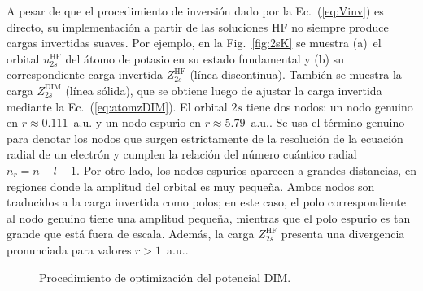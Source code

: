 A pesar de que el procedimiento de inversión dado por la 
Ec.~(\ref{eq:Vinv}) es directo, su implementación a partir de las 
soluciones HF no siempre produce cargas invertidas suaves. Por ejemplo,
en la Fig.~\ref{fig:2sK} se muestra (a)~el orbital $u_{2s}^{\mathrm{HF}}$ 
del átomo de potasio en su estado fundamental y (b) su correspondiente 
carga invertida $Z_{2s}^{\mathrm{HF}}$ (línea discontinua). También se 
muestra la carga $Z_{2s}^{\mathrm{DIM}}$ (línea sólida), que se obtiene 
luego de ajustar la carga invertida mediante la Ec.~(\ref{eq:atomzDIM}). 
El orbital $2s$ tiene dos nodos: un nodo genuino en $r\approx 0.111$~a.u. 
y un nodo espurio en \mbox{$r\approx 5.79$~a.u.}. Se usa el término 
genuino para denotar los nodos que surgen estrictamente de la resolución 
de la ecuación radial de un electrón y cumplen la relación del número 
cuántico radial $n_r=n-l-1$. Por otro lado, los nodos espurios aparecen 
a grandes distancias, en regiones donde la amplitud del orbital es muy 
pequeña. Ambos nodos son traducidos a la carga invertida como polos; en 
este caso, el polo correspondiente al nodo genuino tiene una amplitud 
pequeña, mientras que el polo espurio es tan grande que está fuera de 
escala. Además, la carga $Z_{2s}^{\mathrm{HF}}$ presenta una divergencia 
pronunciada para valores $r>1$~a.u.. 

\begin{figure}[t]
\centering
{}
\caption{Procedimiento de optimización del potencial DIM.}
\label{fig:procDIM}
\end{figure}

